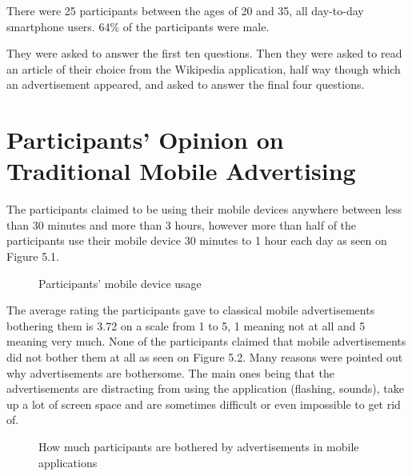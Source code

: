 There were 25 participants between the ages of 20 and 35, all day-to-day smartphone users. 64\% of the participants were male.

They were asked to answer the first ten questions. Then they were asked to read an article of their choice from the Wikipedia application, half way though which an advertisement appeared, and asked to answer the final four questions.

\section{Participants' Opinion on Traditional Mobile Advertising}

The participants claimed to be using their mobile devices anywhere between less than 30 minutes and more than 3 hours, however more than half of the participants use their mobile device 30 minutes to 1 hour each day as seen on Figure 5.1.

\begin{figure}
\begin{center}
\caption{Participants' mobile device usage}
\end{center}
\end{figure}

The average rating the participants gave to classical mobile advertisements bothering them is 3.72 on a scale from 1 to 5, 1 meaning not at all and 5 meaning very much. None of the participants claimed that mobile advertisements did not bother them at all as seen on Figure 5.2. Many reasons were pointed out why advertisements are bothersome. The main ones being that the advertisements are distracting from using the application (flashing, sounds), take up a lot of screen space and are sometimes difficult or even impossible to get rid of.

\begin{figure}
\begin{center}
\caption{How much participants are bothered by advertisements in mobile applications}
\end{center}
\end{figure}

